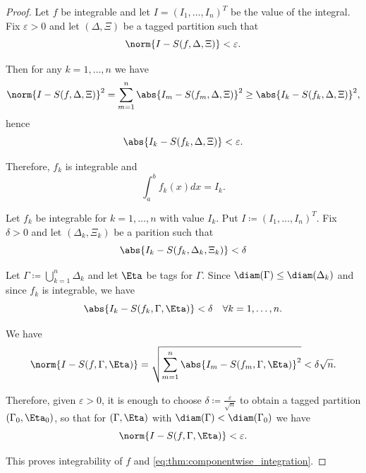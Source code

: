 \begin{proof}
  \SufficiencySubProof Let \( f \) be integrable and let \( I = (I_1, \ldots, I_n)^T \) be the value of the integral. Fix \( \varepsilon > 0 \) and let \( (\Delta, \Xi) \) be a tagged partition such that
  \begin{equation*}
    \norm{I - S(f, \Delta, \Xi)} < \varepsilon.
  \end{equation*}

  Then for any \( k = 1, \ldots, n \) we have
  \begin{equation*}
    \norm{I - S(f, \Delta, \Xi)}^2
    =
    \sum_{m=1}^n \abs{I_m - S(f_m, \Delta, \Xi)}^2
    \geq
    \abs{I_k - S(f_k, \Delta, \Xi)}^2,
  \end{equation*}
  hence
  \begin{equation*}
    \abs{I_k - S(f_k, \Delta, \Xi)} < \varepsilon.
  \end{equation*}

  Therefore, \( f_k \) is integrable and
  \begin{equation*}
    \int_a^b f_k(x) dx = I_k.
  \end{equation*}

  \NecessitySubProof Let \( f_k \) be integrable for \( k = 1, \ldots, n \) with value \( I_k \). Put \( I \coloneqq (I_1, \ldots, I_n)^T \). Fix \( \delta > 0 \) and let \( (\Delta_k, \Xi_k) \) be a parition such that
  \begin{equation*}
    \abs{I_k - S(f_k, \Delta_k, \Xi_k)} < \delta
  \end{equation*}

  Let \( \Gamma \coloneqq \bigcup_{k=1}^n \Delta_k \) and let \( \Eta \) be tags for \( \Gamma \). Since \( \diam(\Gamma) \leq \diam(\Delta_k) \) and since \( f_k \) is integrable, we have
  \begin{equation*}
    \abs{I_k - S(f_k, \Gamma, \Eta)} < \delta \quad\forall k = 1, \ldots, n.
  \end{equation*}

  We have
  \begin{equation*}
    \norm{I - S(f, \Gamma, \Eta)}
    =
    \sqrt{\sum_{m=1}^n \abs{I_m - S(f_m, \Gamma, \Eta)}^2}
    <
    \delta \sqrt{n}.
  \end{equation*}

  Therefore, given \( \varepsilon > 0 \), it is enough to choose \( \delta \coloneqq \frac {\varepsilon} {\sqrt n} \) to obtain a tagged partition \( (\Gamma_0, \Eta_0) \), so that for \( (\Gamma, \Eta) \) with \( \diam(\Gamma) < \diam(\Gamma_0) \) we have
  \begin{equation*}
    \norm{I - S(f, \Gamma, \Eta)} < \varepsilon.
  \end{equation*}

  This proves integrability of \( f \) and \eqref{eq:thm:componentwise_integration}.
\end{proof}
